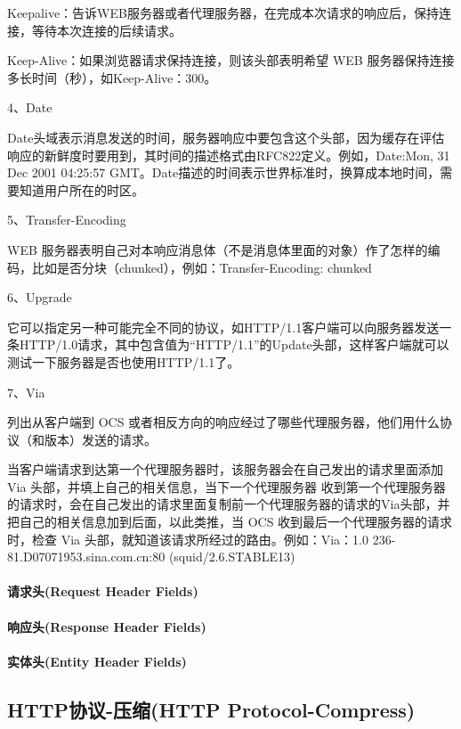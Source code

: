 \documentclass{book}
\begin{document}
Keepalive：告诉WEB服务器或者代理服务器，在完成本次请求的响应后，保持连接，等待本次连接的后续请求。

Keep-Alive：如果浏览器请求保持连接，则该头部表明希望 WEB 服务器保持连接多长时间（秒），如Keep-Alive：300。

4、Date

Date头域表示消息发送的时间，服务器响应中要包含这个头部，因为缓存在评估响应的新鲜度时要用到，其时间的描述格式由RFC822定义。例如，Date:Mon, 31 Dec 2001 04:25:57 GMT。Date描述的时间表示世界标准时，换算成本地时间，需要知道用户所在的时区。

5、Transfer-Encoding

WEB 服务器表明自己对本响应消息体（不是消息体里面的对象）作了怎样的编码，比如是否分块（chunked），例如：Transfer-Encoding: chunked

6、Upgrade

它可以指定另一种可能完全不同的协议，如HTTP/1.1客户端可以向服务器发送一条HTTP/1.0请求，其中包含值为“HTTP/1.1”的Update头部，这样客户端就可以测试一下服务器是否也使用HTTP/1.1了。

7、Via

列出从客户端到 OCS 或者相反方向的响应经过了哪些代理服务器，他们用什么协议（和版本）发送的请求。

当客户端请求到达第一个代理服务器时，该服务器会在自己发出的请求里面添加 Via 头部，并填上自己的相关信息，当下一个代理服务器 收到第一个代理服务器的请求时，会在自己发出的请求里面复制前一个代理服务器的请求的Via头部，并把自己的相关信息加到后面，以此类推，当 OCS 收到最后一个代理服务器的请求时，检查 Via 头部，就知道该请求所经过的路由。例如：Via：1.0 236-81.D07071953.sina.com.cn:80 (squid/2.6.STABLE13)

\paragraph{请求头(Request Header Fields)}

\paragraph{响应头(Response Header Fields)}

\paragraph{实体头(Entity Header Fields)}

\subsection{HTTP协议-压缩(HTTP Protocol-Compress)}
\end{document}
